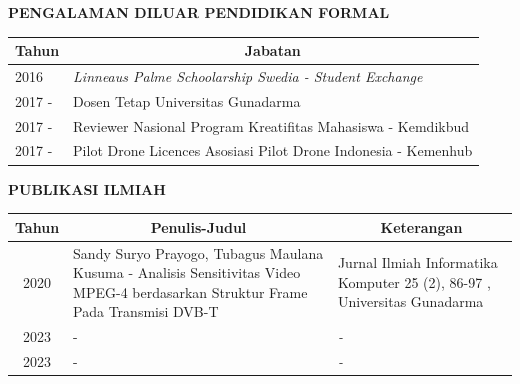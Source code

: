 \vspace{0.5cm}
\noindent \textbf{PENGALAMAN DILUAR PENDIDIKAN FORMAL}
\vspace{0.2cm}


\begin{table}[H]
		\centering
	\begin{tabular}{|l|p{11.5cm}|}
		\hline
		\multicolumn{1}{|c|}{\textbf{Tahun}} & \multicolumn{1}{c|}{\textbf{Jabatan}}                      \\ \hline
		2016      & \textit{Linneaus Palme Schoolarship Swedia - Student Exchange}  \\ \hline
		2017 -      &  Dosen Tetap Universitas Gunadarma \\ \hline
		2017 -      &  Reviewer Nasional Program Kreatifitas Mahasiswa - Kemdikbud \\ \hline
		2017 -      &  Pilot Drone Licences Asosiasi Pilot Drone Indonesia  - Kemenhub\\ \hline
	\end{tabular}%
		\centering
\end{table}


\vspace{0.5cm}
\noindent \textbf{PUBLIKASI ILMIAH}
\vspace{0.2cm}


\begin{table}[H]
	\begin{tabular}{|c|p{6cm}|p{5.7cm}|}
		\hline
		\textbf{Tahun} &
		\multicolumn{1}{c|}{\textbf{Penulis-Judul}} &
		\multicolumn{1}{c|}{\textbf{Keterangan}} \\ \hline
		2020 & Sandy Suryo Prayogo, Tubagus Maulana Kusuma -  Analisis Sensitivitas Video MPEG-4 berdasarkan Struktur Frame Pada Transmisi DVB-T
 & Jurnal Ilmiah Informatika Komputer 25 (2), 86-97 , Universitas Gunadarma\\ \hline
		2023 &  -  & \textit{-} \\ \hline
		2023 &  -  & \textit{-} \\ \hline

	\end{tabular}%
\end{table}


 



